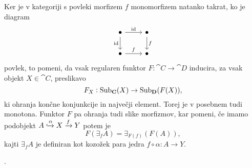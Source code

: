 \documentclass[../kategoricna_logika.tex]{subfiles}
\begin{document}
\begin{dokaz}
Ker je v kategoriji s povleki morfizem $f$ monomorfizem natanko
takrat, ko je diagram
\begin{equation*}
  \begin{tikzcd}
    \bullet \ar[d, "\mathrm{id}"'] \ar[r, "\mathrm{id}"] & \bullet \ar[d, "f"] \\
    \bullet \ar[r, "f"] & \bullet
  \end{tikzcd}
\end{equation*}
povlek, to pomeni, da vsak regularen funktor $F : \cat{C} \to \cat{D}$
inducira, za vsak objekt $X \in \cat{C}$, preslikavo
$$F_X : \operatorname{Sub}_{\operatorname{\mathbf{C}}}(X) \to \operatorname{Sub}_{\operatorname{\mathbf{D}}}(F(X)),$$
ki ohranja končne konjunkcije in največji element. Torej je v posebnem
tudi monotona.  Funktor $F$ pa ohranja tudi slike morfizmov, kar
pomeni, če imamo podobjekt
$A \xhookrightarrow{\alpha} X \xrightarrow{f} Y$ potem je
$$F(\exists_f A) = \exists_{F(f)}(F(A)),$$
kajti $\exists_f A$ je definiran kot kozožek para jedra
$f \circ \alpha : A \to Y$.
\end{dokaz}.
%
%
\end{document}

